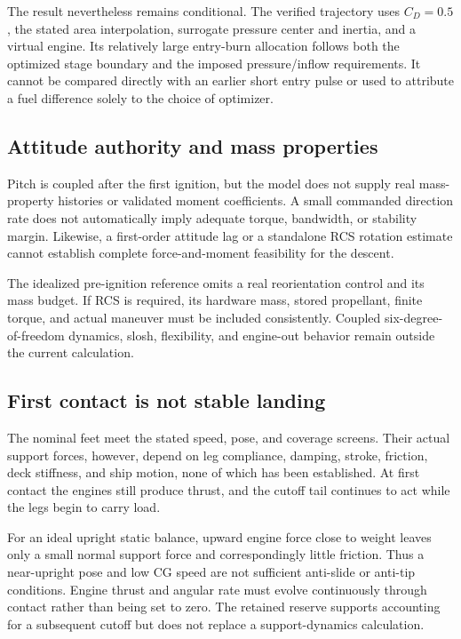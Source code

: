 \documentclass[11pt,a4paper]{article}
\begin{document}
The result nevertheless remains conditional. The verified trajectory uses $C_D=0.5$, the stated area interpolation, surrogate pressure center and inertia, and a virtual engine. Its relatively large entry-burn allocation follows both the optimized stage boundary and the imposed pressure/inflow requirements. It cannot be compared directly with an earlier short entry pulse or used to attribute a fuel difference solely to the choice of optimizer.

\subsection{Attitude authority and mass properties}
Pitch is coupled after the first ignition, but the model does not supply real mass-property histories or validated moment coefficients. A small commanded direction rate does not automatically imply adequate torque, bandwidth, or stability margin. Likewise, a first-order attitude lag or a standalone RCS rotation estimate cannot establish complete force-and-moment feasibility for the descent.

The idealized pre-ignition reference omits a real reorientation control and its mass budget. If RCS is required, its hardware mass, stored propellant, finite torque, and actual maneuver must be included consistently. Coupled six-degree-of-freedom dynamics, slosh, flexibility, and engine-out behavior remain outside the current calculation.

\subsection{First contact is not stable landing}
The nominal feet meet the stated speed, pose, and coverage screens. Their actual support forces, however, depend on leg compliance, damping, stroke, friction, deck stiffness, and ship motion, none of which has been established. At first contact the engines still produce thrust, and the cutoff tail continues to act while the legs begin to carry load.

For an ideal upright static balance, upward engine force close to weight leaves only a small normal support force and correspondingly little friction. Thus a near-upright pose and low CG speed are not sufficient anti-slide or anti-tip conditions. Engine thrust and angular rate must evolve continuously through contact rather than being set to zero. The retained reserve supports accounting for a subsequent cutoff but does not replace a support-dynamics calculation.
\end{document}

